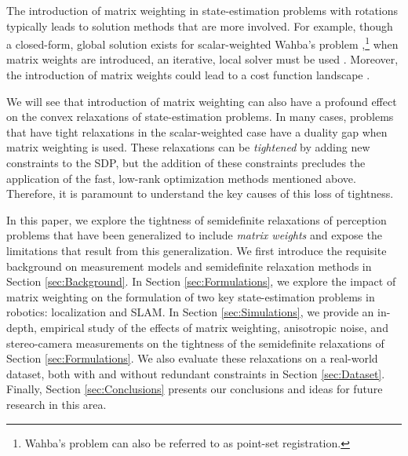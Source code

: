 \documentclass[lettersize,journal]{IEEEtran}
\newcommand{\rev}[1]{\color{red}{#1}\color{black}}
\begin{document}
The introduction of matrix weighting in state-estimation problems with rotations typically leads to solution methods that are more involved. For example, though a closed-form, global solution exists for scalar-weighted Wahba's problem \cite{hornClosedformSolutionAbsolute1987, hornClosedFormSolutionAbsolute1988, wahbaLeastSquaresEstimate1965},\footnote{Wahba's problem can also be referred to as point-set registration.} when matrix weights are introduced, an iterative, local solver must be used \cite{chengTotalLeastSquaresEstimate2019, barfootStateEstimationRobotics2017}. Moreover, the introduction of matrix weights could lead to a cost function landscape \rev{ with more local minima}. 

We will see that introduction of matrix weighting can also have a profound effect on the convex relaxations of state-estimation problems. In many cases, problems that have tight relaxations in the scalar-weighted case have a duality gap when matrix weighting is used. These relaxations can be \emph{tightened} by adding new constraints to the SDP, but the addition of these constraints precludes the application of the fast, low-rank optimization methods mentioned above. Therefore, it is paramount to understand the key causes of this loss of tightness.

In this paper, we explore the tightness of semidefinite relaxations of perception problems that have been generalized to include \emph{matrix weights} and expose the limitations that result from this generalization. We first introduce the requisite background on measurement models and semidefinite relaxation methods in Section \ref{sec:Background}. In Section \ref{sec:Formulations}, we explore the impact of matrix weighting on the formulation of two key state-estimation problems in robotics: localization and SLAM.
In Section \ref{sec:Simulations}, we provide an in-depth, empirical study of the effects of matrix weighting, anisotropic noise, and stereo-camera measurements on the tightness of the semidefinite relaxations of Section \ref{sec:Formulations}. We also evaluate these relaxations on a real-world dataset, both with and without redundant constraints in Section \ref{sec:Dataset}. Finally, Section \ref{sec:Conclusions} presents our conclusions and ideas for future research in this area.
\end{document}
